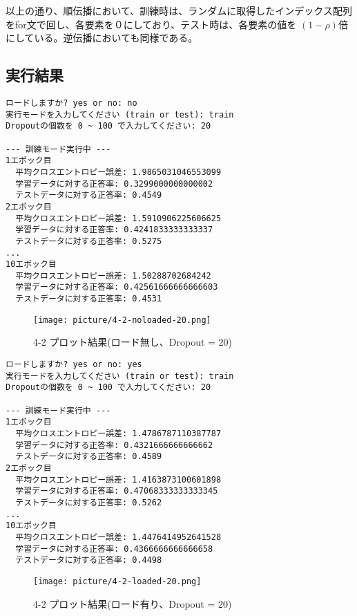 \documentclass[11px,a4,dvipdfmx]{jsarticle}
\begin{document}
以上の通り、順伝播において、訓練時は、ランダムに取得したインデックス配列をfor文で回し、各要素を０にしており、テスト時は、各要素の値を $(1 - \rho)$倍にしている。逆伝播においても同様である。
\subsection{実行結果}
\begin{verbatim}
ロードしますか? yes or no: no
実行モードを入力してください (train or test): train
Dropoutの個数を 0 ~ 100 で入力してください: 20

--- 訓練モード実行中 ---
1エポック目
  平均クロスエントロピー誤差: 1.9865031046553099
  学習データに対する正答率: 0.3299000000000002
  テストデータに対する正答率: 0.4549
2エポック目
  平均クロスエントロピー誤差: 1.5910906225606625
  学習データに対する正答率: 0.4241833333333337
  テストデータに対する正答率: 0.5275
...
10エポック目
  平均クロスエントロピー誤差: 1.50288702684242
  学習データに対する正答率: 0.42561666666666603
  テストデータに対する正答率: 0.4531
\end{verbatim}
 \begin{figure}[H]
		      \begin{center}
			      \texttt{[image: picture/4-2-noloaded-20.png]}
			      \caption{4-2 プロット結果(ロード無し、Dropout = 20)}
		      \end{center}
\end{figure}
\begin{verbatim}
ロードしますか? yes or no: yes
実行モードを入力してください (train or test): train
Dropoutの個数を 0 ~ 100 で入力してください: 20

--- 訓練モード実行中 ---
1エポック目
  平均クロスエントロピー誤差: 1.4786787110387787
  学習データに対する正答率: 0.4321666666666662
  テストデータに対する正答率: 0.4589
2エポック目
  平均クロスエントロピー誤差: 1.4163873100601898
  学習データに対する正答率: 0.47068333333333345
  テストデータに対する正答率: 0.5262
...
10エポック目
  平均クロスエントロピー誤差: 1.4476414952641528
  学習データに対する正答率: 0.4366666666666658
  テストデータに対する正答率: 0.4498
\end{verbatim}
 \begin{figure}[H]
		      \begin{center}
			      \texttt{[image: picture/4-2-loaded-20.png]}
			      \caption{4-2 プロット結果(ロード有り、Dropout = 20)}
		      \end{center}
\end{figure}
\end{document}
